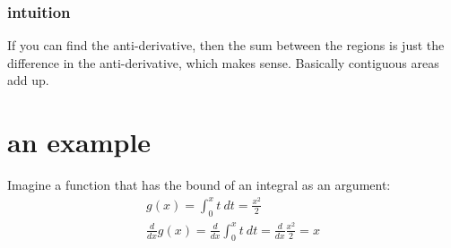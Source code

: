 \documentclass[letterpaper]{article}
\begin{document}
\subsubsection{intuition}
\label{sec:org497824b}
If you can find the anti-derivative, then the sum between the regions is just the difference in the anti-derivative, which makes sense. Basically contiguous areas add up.
\section{an example}
\label{sec:org14b4584}
Imagine a function that has the bound of an integral as an argument:
\[\begin{aligned}
  g(x) = \int_0^x t\ dt = \frac{x^2}{2}\\
  \frac{d}{dx}g(x) = \frac{d}{dx}\int_0^x t\ dt = \frac{d}{dx}\frac{x^2}{2} = x
  \end{aligned}\]
\end{document}
